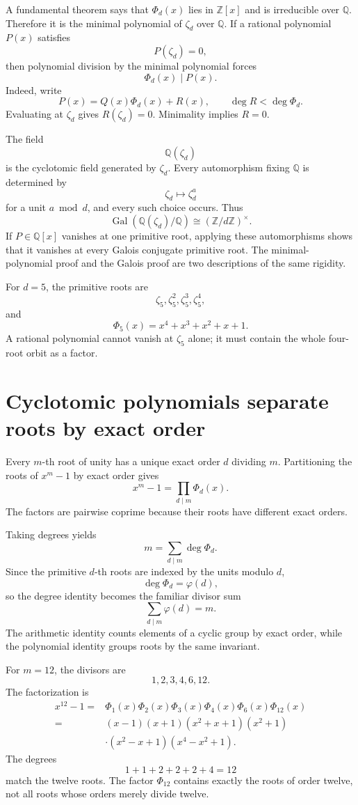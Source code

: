 A fundamental theorem says that \(\Phi_d(x)\) lies in \(\mathbb Z[x]\) and is irreducible over \(\mathbb Q\).  Therefore it is the minimal polynomial of \(\zeta_d\) over \(\mathbb Q\).  If a rational polynomial \(P(x)\) satisfies
\[
  P(\zeta_d)=0,
\]
then polynomial division by the minimal polynomial forces
\[
  \Phi_d(x)\mid P(x).
\]
Indeed, write
\[
  P(x)=Q(x)\Phi_d(x)+R(x),
  \qquad
  \deg R<\deg\Phi_d.
\]
Evaluating at \(\zeta_d\) gives \(R(\zeta_d)=0\).  Minimality implies \(R=0\).

The field
\[
  \mathbb Q(\zeta_d)
\]
is the cyclotomic field generated by \(\zeta_d\).  Every automorphism fixing \(\mathbb Q\) is determined by
\[
  \zeta_d\longmapsto\zeta_d^a
\]
for a unit \(a\bmod d\), and every such choice occurs.  Thus
\[
  \operatorname{Gal}(\mathbb Q(\zeta_d)/\mathbb Q)
  \cong(\mathbb Z/d\mathbb Z)^\times.
\]
If \(P\in\mathbb Q[x]\) vanishes at one primitive root, applying these automorphisms shows that it vanishes at every Galois conjugate primitive root.  The minimal-polynomial proof and the Galois proof are two descriptions of the same rigidity.

For \(d=5\), the primitive roots are
\[
  \zeta_5,\zeta_5^2,\zeta_5^3,\zeta_5^4,
\]
and
\[
  \Phi_5(x)=x^4+x^3+x^2+x+1.
\]
A rational polynomial cannot vanish at \(\zeta_5\) alone; it must contain the whole four-root orbit as a factor.

\section{Cyclotomic polynomials separate roots by exact order}

Every \(m\)-th root of unity has a unique exact order \(d\) dividing \(m\).  Partitioning the roots of \(x^m-1\) by exact order gives
\[
  \boxed{x^m-1=\prod_{d\mid m}\Phi_d(x).}
\]
The factors are pairwise coprime because their roots have different exact orders.

Taking degrees yields
\[
  m=\sum_{d\mid m}\deg\Phi_d.
\]
Since the primitive \(d\)-th roots are indexed by the units modulo \(d\),
\[
  \deg\Phi_d=\varphi(d),
\]
so the degree identity becomes the familiar divisor sum
\[
  \sum_{d\mid m}\varphi(d)=m.
\]
The arithmetic identity counts elements of a cyclic group by exact order, while the polynomial identity groups roots by the same invariant.

For \(m=12\), the divisors are
\[
  1,2,3,4,6,12.
\]
The factorization is
\[
\begin{aligned}
x^{12}-1
={}&\Phi_1(x)\Phi_2(x)\Phi_3(x)
\Phi_4(x)\Phi_6(x)\Phi_{12}(x)\\
={}&(x-1)(x+1)(x^2+x+1)(x^2+1)\\
&\cdot(x^2-x+1)(x^4-x^2+1).
\end{aligned}
\]
The degrees
\[
  1+1+2+2+2+4=12
\]
match the twelve roots.  The factor \(\Phi_{12}\) contains exactly the roots of order twelve, not all roots whose orders merely divide twelve.


